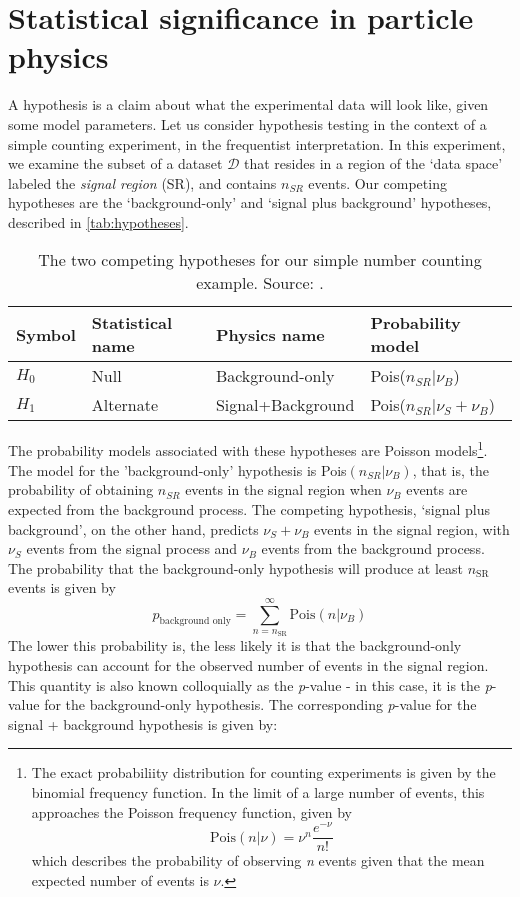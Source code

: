 \section{Statistical significance in particle physics}
A hypothesis is a claim about what the experimental data will look like, given some model parameters. Let us consider hypothesis testing in the context of a simple counting experiment, in the frequentist interpretation. In this experiment, we examine the subset of a dataset $\mathcal{D}$ that resides in a region of the `data space' labeled the \emph{signal region} (SR), and contains $n_{SR}$ events. Our competing hypotheses are the `background-only' and `signal plus background' hypotheses, described in \autoref{tab:hypotheses}. 
\begin{table}
  \begin{tabular}{llll}
    \toprule
    Symbol & Statistical name & Physics name & Probability model\\
    \midrule
    $H_0$ & Null & Background-only & Pois($n_{SR}|\nu_B$)\\
    $H_1$ & Alternate & Signal+Background & Pois($n_{SR}|\nu_S+\nu_B$)\\
    \bottomrule
  \end{tabular}
  \caption{The two competing hypotheses for our simple number counting example. Source: \cite{Cranmer2015}.}
  \label{tab:hypotheses}
\end{table}
The probability models associated with these hypotheses are Poisson models\footnote{The exact probabiliity distribution for counting experiments is given by the binomial frequency function. In the limit of a large number of events, this approaches the Poisson frequency function, given by
  \[\text{Pois}(n|\nu) = \nu^n\frac{e^{-\nu}}{n!}\]
  which describes the probability of observing \emph{n} events given that the mean expected number of events is $\nu$.
}. The model for the 'background-only' hypothesis is Pois$(n_{SR}|\nu_B)$, that is, the probability of obtaining $n_{SR}$ events in the signal region when $\nu_B$ events are expected from the background process. The competing hypothesis, `signal plus background', on the other hand, predicts $\nu_S+\nu_B$ events in the signal region, with $\nu_S$ events from the signal process and $\nu_B$ events from the background process. The probability that the background-only hypothesis will produce at least $n_\text{SR}$ events is given by
\[p_\text{background only} = \sum_{n=n_\text{SR}}^\infty \text{Pois}(n|\nu_B)\]
The lower this probability is, the less likely it is that the background-only hypothesis can account for the observed number of events in the signal region. This quantity is also known colloquially as the \emph{p}-value - in this case, it is the \emph{p}-value for the background-only hypothesis. The corresponding \emph{p}-value for the signal + background hypothesis is given by:
